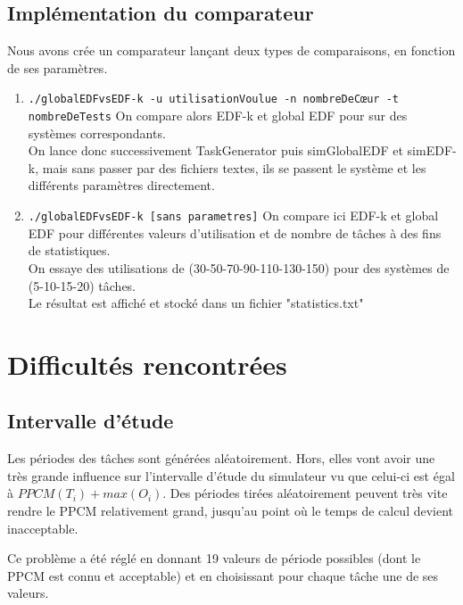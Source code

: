 \documentclass[a4paper,10pt]{article}
\begin{document}
	\subsection{Implémentation du comparateur}
		Nous avons crée un comparateur lançant deux types de comparaisons, en fonction de ses paramètres.
		\begin{enumerate}
			\item \verb?./globalEDFvsEDF-k -u utilisationVoulue -n nombreDeCœur -t nombreDeTests?
					On compare alors EDF-k et global EDF pour sur des systèmes correspondants.\\
					On lance donc successivement TaskGenerator puis simGlobalEDF et simEDF-k, mais sans passer par des fichiers textes, ils se passent le système et les différents paramètres directement.
			\item \verb?./globalEDFvsEDF-k [sans parametres]?
					On compare ici EDF-k et global EDF pour différentes valeurs d'utilisation et de nombre de tâches à des fins de statistiques.\\
					On essaye des utilisations de (30-50-70-90-110-130-150) pour des systèmes de (5-10-15-20) tâches.\\
					Le résultat est affiché et stocké dans un fichier "statistics.txt"
		\end{enumerate}
		
		
\section{Difficultés rencontrées}

	\subsection{Intervalle d'étude}

		Les périodes des tâches sont générées aléatoirement. Hors, elles vont avoir une très grande influence sur l'intervalle d'étude du simulateur vu que 		celui-ci est égal à $PPCM(T_i)+ max(O_i)$. Des périodes tirées aléatoirement peuvent très vite rendre le PPCM relativement grand, jusqu'au point où 		le temps de calcul devient inacceptable.

		Ce problème a été réglé en donnant 19 valeurs de période possibles (dont le PPCM est connu et acceptable) et en choisissant pour chaque tâche une 			de ses valeurs.\\
\end{document}
